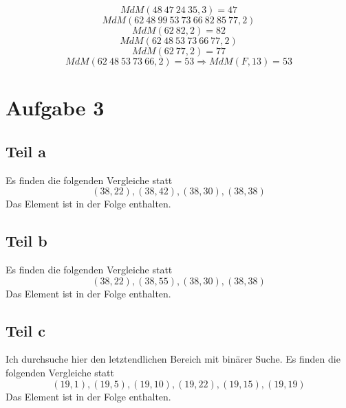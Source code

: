 \documentclass[10pt,a4paper]{article}
\begin{document}
\begin{equation}
  MdM(48\ 47\ 24\ 35, 3) = 47
\end{equation}
\begin{equation}
  MdM(62\ 48\ 99\ 53\ 73\ 66\ 82\ 85\ 77, 2)
\end{equation}
\begin{equation}
  MdM(62\ 82, 2) = 82
\end{equation}
\begin{equation}
  MdM(62\ 48\ 53\ 73\ 66\ 77, 2)
\end{equation}
\begin{equation}
  MdM(62\ 77, 2) = 77
\end{equation}
\begin{equation}
  MdM(62\ 48\ 53\ 73\ 66, 2) = 53 \Rightarrow MdM(F, 13) = 53
\end{equation}

\section{Aufgabe 3}

\subsection{Teil a}
Es finden die folgenden Vergleiche statt
\begin{equation}
  (38, 22), (38, 42), (38, 30), (38, 38)
\end{equation}
Das Element ist in der Folge enthalten.

\subsection{Teil b}
Es finden die folgenden Vergleiche statt
\begin{equation}
  (38, 22), (38, 55), (38, 30), (38, 38)
\end{equation}
Das Element ist in der Folge enthalten.

\subsection{Teil c}
Ich durchsuche hier den letztendlichen Bereich mit binärer Suche.
Es finden die folgenden Vergleiche statt
\begin{equation}
  (19, 1), (19, 5), (19, 10), (19, 22), (19, 15), (19, 19)
\end{equation}
Das Element ist in der Folge enthalten.
\end{document}
